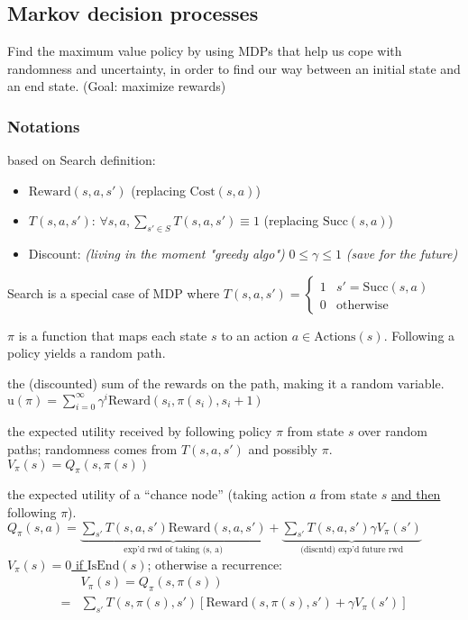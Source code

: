 \subsection{Markov decision processes}

Find the maximum value policy by using MDPs that help us cope with randomness
and uncertainty, in order to find our way between an initial state and an end
state. (Goal: maximize rewards)

\subsubsection{Notations}

 based on Search definition:
\begin{itemize}
    \item $\text{Reward}(s,a,s')$ (replacing $\text{Cost}(s,a)$)
    \item $T(s,a,s')$: $\forall s,a, \sum_{s'\in S} T(s,a,s') \equiv 1$ (replacing $\text{Succ}(s,a)$)
    \item Discount: \emph{(living in the moment "greedy algo")} $0 \le \gamma \le 1$ \emph{(save for the future)}
\end{itemize}
Search is a special case of MDP where $T(s,a,s') = \begin{cases}
    1 & s' = \text{Succ}(s,a) \\
    0 & \text{otherwise}
\end{cases}$

 $\pi$ is a function that maps each state $s$ to an action $a \in
\text{Actions}(s)$. Following a policy yields a random path.

 the (discounted) sum of the rewards on the
path, making it a random variable.
$\text{u}(\pi) = \sum_{i=0}^{\infty} \gamma^i \text{Reward}(s_i, \pi(s_i), s_i + 1)$

 the expected utility received by
following policy $\pi$ from state $s$ over random paths; randomness comes from
$T(s,a,s')$ and possibly $\pi$. $V_\pi(s) = Q_\pi(s,\pi(s))$

 the expected utility of a ``chance node'' (taking action $a$ from
state $s$ \underline{and then} following $\pi$).
$Q_\pi(s,a)
= \underbrace{\sum_{s'}T(s,a,s') \text{Reward}(s,a,s')}_{\text{exp'd rwd of taking (s, a)}}
+ \underbrace{\sum_{s'}T(s,a,s') \gamma V_\pi(s')}_{\text{(discntd) exp'd future rwd}}$
\underline{$V_\pi(s) = 0$ if $\text{IsEnd}(s)$};
otherwise a recurrence:
\begin{displaymath}
\boxed{
\begin{aligned}
    &V_\pi(s) = Q_\pi(s,\pi(s)) \\
    =&\sum_{s'}T(s,\pi(s),s')\left[\text{Reward}(s,\pi(s),s') + \gamma V_\pi(s')\right]
\end{aligned}
}
\end{displaymath}

